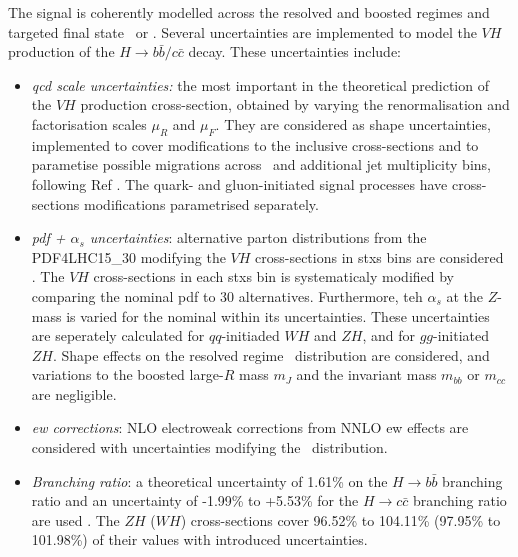The signal is coherently modelled across the resolved and boosted regimes and targeted final state \vhb\ or \vhc. Several uncertainties are implemented to model the $VH$ production of the $H \rightarrow b\bar{b}/c\bar{c}$ decay. These uncertainties include:
\begin{itemize}
    \item \textit{\gls{qcd} scale uncertainties:} the most important in the theoretical prediction of the $VH$ production cross-section, obtained by varying the renormalisation and factorisation scales $\mu_R$ and $\mu_F$. They are considered as shape uncertainties, implemented to cover modifications to the inclusive cross-sections and to parametise possible migrations across \ptv\ and additional jet multiplicity bins, following Ref \cite{ATL-PHYS-PUB-2018-035}. The quark- and gluon-initiated signal processes have cross-sections modifications parametrised separately. 
    \item \textit{\gls{pdf} + $\alpha_s$ uncertainties}: alternative parton distributions from the \textsc{PDF4LHC15\_30} modifying the $VH$ cross-sections in \gls{stxs} bins are considered  \cite{Butterworth:2015oua}. The $VH$ cross-sections in each \gls{stxs} bin is systematicaly modified by comparing the nominal \gls{pdf} to 30 alternatives. Furthermore, teh $\alpha_s$ at the $Z$-mass is varied for the nominal within its uncertainties. These uncertainties are seperately calculated for $qq$-initiaded $WH$ and $ZH$, and for $gg$-initiated $ZH$. Shape effects on the resolved regime \ptv\ distribution are considered, and variations to the boosted large-$R$ mass $m_J$ and the invariant mass $m_{bb}$ or $m_{cc}$ are negligible.
    \item \textit{\gls{ew} corrections}: NLO electroweak corrections from NNLO \gls{ew} effects are considered with uncertainties modifying the \ptv\ distribution.
    \item \textit{Branching ratio}: a theoretical uncertainty of 1.61\% on the $H \rightarrow{b\bar{b}}$ branching ratio and an uncertainty of -1.99\% to +5.53\% for the $H \rightarrow{c\bar{c}}$ branching ratio are used \cite{LHCHiggsCrossSectionWorkingGroup:2016ypw}. The $ZH$ ($WH$) cross-sections cover 96.52\% to 104.11\% (97.95\% to 101.98\%) of their values with introduced uncertainties.

\end{itemize}
